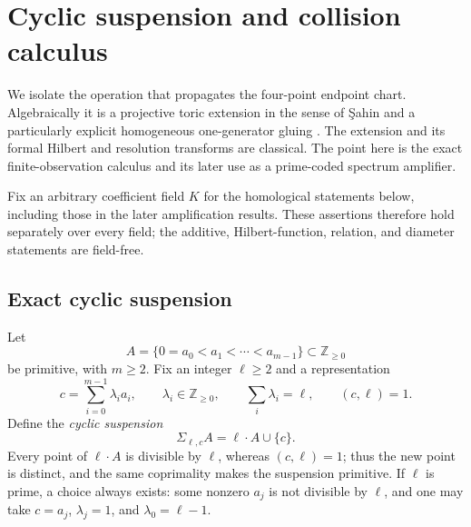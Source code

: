 \documentclass[11pt,reqno]{amsart}
\theoremstyle{definition}
\theoremstyle{remark}
\begin{document}
\section{Cyclic suspension and collision calculus}
\label{sec:suspension-calculus}

We isolate the operation that propagates the four-point endpoint chart.
Algebraically it is a projective toric extension in the sense of \c{S}ahin
and a particularly explicit homogeneous one-generator gluing
\cite{Sahin2011,GimenezSrinivasan2019,GimenezSrinivasan2025}.  The extension
and its formal Hilbert and resolution transforms are classical.  The point
here is the exact finite-observation calculus and its later use as a
prime-coded spectrum amplifier.

Fix an arbitrary coefficient field $K$ for the homological statements below,
including those in the later amplification results.  These assertions therefore
hold separately over every field; the additive, Hilbert-function, relation, and
diameter statements are field-free.

\subsection{Exact cyclic suspension}

Let
\[
 A=\{0=a_0<a_1<\cdots<a_{m-1}\}\subset\mathbb Z_{\geq0}
\]
be primitive, with $m\geq2$.  Fix an integer $\ell\geq2$ and a representation
\begin{equation}\label{eq:suspension-representation}
 c=\sum_{i=0}^{m-1}\lambda_i a_i,\qquad
 \lambda_i\in\mathbb Z_{\geq0},\qquad
 \sum_i\lambda_i=\ell,\qquad (c,\ell)=1.
\end{equation}
Define the \emph{cyclic suspension}
\[
 \Sigma_{\ell,c}A=\ell\mathbin{\cdot}A\cup\{c\}.
\]
Every point of $\ell\mathbin{\cdot}A$ is divisible by $\ell$, whereas
$(c,\ell)=1$; thus the new point is distinct, and the same coprimality
makes the suspension primitive.  If $\ell$ is prime, a choice always exists:
some nonzero $a_j$ is not divisible by $\ell$, and one may take
$c=a_j$, $\lambda_j=1$, and $\lambda_0=\ell-1$.
\end{document}
